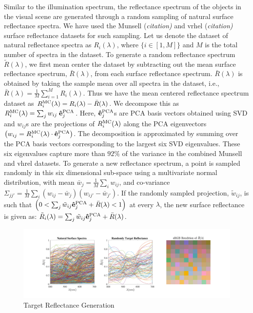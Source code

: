 \documentclass{jov}
\begin{document}
Similar to the illumination spectrum, the reflectance spectrum of the 
objects in the visual scene are generated through a random 
sampling of natural surface reflectance spectra. We have used 
the Munsell {(\it citation)} and vrhel {(\it citation)} surface reflectance 
datasets for such sampling. Let us denote the dataset of natural 
reflectance spectra as $R_i(\lambda)$, where $\{i \in [1,M]\}$ 
and $M$ is the total number of spectra in the dataset. To generate 
a random reflectance spectrum $\tilde{R}(\lambda)$, 
we first mean center the dataset by subtracting out the 
mean surface reflectance spectrum, $\bar{R}(\lambda)$,
from each surface reflectance spectrum.
$\bar{R}(\lambda)$ is obtained by taking the sample 
mean over all spectra in the dataset, i.e.,
$\bar{R}(\lambda) = \frac{1}{M} \sum_{i=1}^M R_i(\lambda)$. 
Thus we have the mean centered reflectance 
spectrum dataset as $R_i^{\rm MC}(\lambda) =  R_i(\lambda)-\bar{R}(\lambda)$. 
We decompose this as $R_i^{\rm MC}(\lambda) = \sum_j{w_{ij} \; {\bf \hat{e}}_j^{\rm PCA}}$. Here,
${\bf \hat{e}}_j^{\rm PCA}$s are PCA basis vectors obtained using SVD 
and $w_{ij}$s are the projections of $R_i^{\rm MC}(\lambda)$ along the PCA eigenvectors 
$\left( w_{ij} = R_i^{\rm MC}(\lambda)\cdot {\bf \hat{e}}_j^{\rm PCA}\right)$. The 
decomposition is approximated by summing over the PCA basis 
vectors corresponding to the largest six SVD eigenvalues. These six eigenvalues capture 
more than $92\%$ of the variance in the combined Munsell and vhrel datasets. To generate 
a new reflectance spectrum, a point is sampled randomly in this 
six dimensional sub-space using a multivariate normal 
distribution, with mean $\bar{w}_j = \frac{1}{M}\sum_i w_{ij}$, 
and co-variance $\Sigma_{jj'} = \frac{1}{M} \sum_i \left(w_{ij} -\bar{w}_j\right)\left(w_{ij'} -\bar{w}_{j'}\right) $. If the randomly sampled projection, $\tilde{w}_{ij}$, is 
such that $\left( 0 < \sum_j \tilde{w}_{ij}{\bf \hat{e}}_j^{\rm PCA} + \bar{R}(\lambda)<1\right) $ at every $\lambda$, the new surface reflectance 
is given as: $\tilde{R}_i(\lambda) =\sum_j \tilde{w}_{ij}{\bf \hat{e}}_j^{\rm PCA} + \bar{R}(\lambda)$.

\begin{figure}
\centering
	\includegraphics[width=\textwidth]{../Figures/Figure14/Figure14.pdf}
    \caption{Target Reflectance Generation}
    \label{fig:targetGeneration}
\end{figure}
\end{document}
